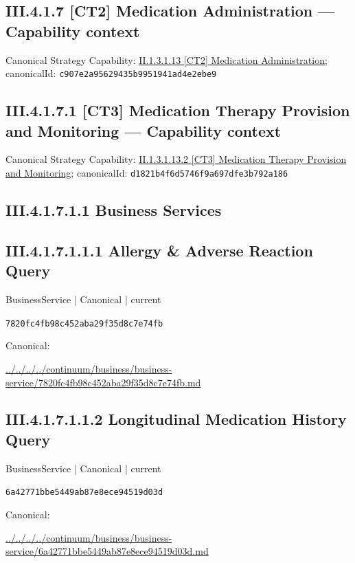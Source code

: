\documentclass[10pt,a4paper]{article}
\begin{document}
\subsection*{III.4.1.7 [CT2] Medication Administration — Capability context}
Canonical Strategy Capability: \hyperref[element-c907e2a95629435b9951941ad4e2ebe9]{II.1.3.1.13 [CT2] Medication Administration}; canonicalId: \texttt{c907e2a95629435b9951941ad4e2ebe9}\par
\subsection*{III.4.1.7.1 [CT3] Medication Therapy Provision and Monitoring — Capability context}
Canonical Strategy Capability: \hyperref[element-d1821b4f6d5746f9a697dfe3b792a186]{II.1.3.1.13.2 [CT3] Medication Therapy Provision and Monitoring}; canonicalId: \texttt{d1821b4f6d5746f9a697dfe3b792a186}\par
\subsection*{III.4.1.7.1.1 Business Services}
\subsection*{III.4.1.7.1.1.1 Allergy \& Adverse Reaction Query}
\label{element-7820fc4fb98c452aba29f35d8c7e74fb}
{\small BusinessService | Canonical | current}\par
\texttt{7820fc4fb98c452aba29f35d8c7e74fb}\par
Canonical: \par
{\footnotesize\url{../../../../continuum/business/business-service/7820fc4fb98c452aba29f35d8c7e74fb.md}}\par
\subsection*{III.4.1.7.1.1.2 Longitudinal Medication History Query}
\label{element-6a42771bbe5449ab87e8ece94519d03d}
{\small BusinessService | Canonical | current}\par
\texttt{6a42771bbe5449ab87e8ece94519d03d}\par
Canonical: \par
{\footnotesize\url{../../../../continuum/business/business-service/6a42771bbe5449ab87e8ece94519d03d.md}}\par
\end{document}
